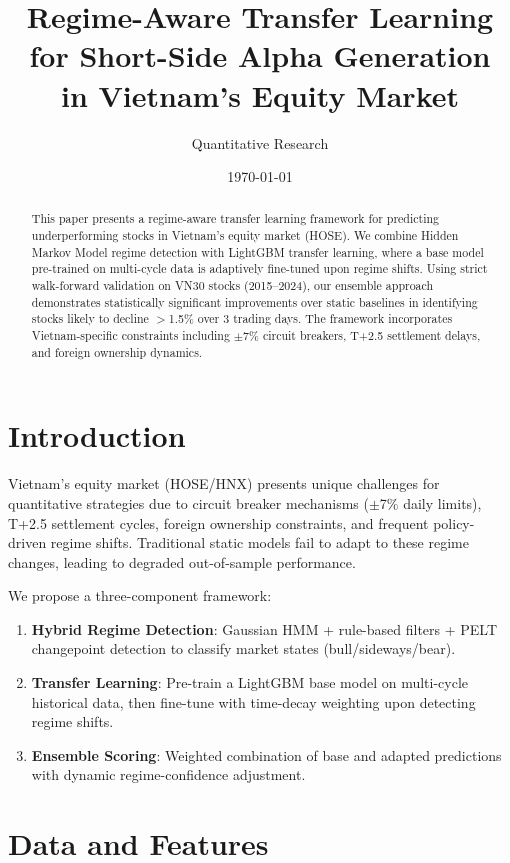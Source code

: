 \documentclass[12pt,a4paper]{article}
\title{Regime-Aware Transfer Learning for Short-Side Alpha Generation\\in Vietnam's Equity Market}
\author{Quantitative Research}
\date{\today}
\begin{document}
\maketitle

\begin{abstract}
This paper presents a regime-aware transfer learning framework for predicting
underperforming stocks in Vietnam's equity market (HOSE). We combine Hidden Markov
Model regime detection with LightGBM transfer learning, where a base model
pre-trained on multi-cycle data is adaptively fine-tuned upon regime shifts.
Using strict walk-forward validation on VN30 stocks (2015--2024), our ensemble
approach demonstrates statistically significant improvements over static baselines
in identifying stocks likely to decline $>$1.5\% over 3 trading days.
The framework incorporates Vietnam-specific constraints including $\pm$7\% circuit
breakers, T+2.5 settlement delays, and foreign ownership dynamics.
\end{abstract}

\section{Introduction}
\label{sec:intro}

Vietnam's equity market (HOSE/HNX) presents unique challenges for quantitative
strategies due to circuit breaker mechanisms ($\pm$7\% daily limits), T+2.5
settlement cycles, foreign ownership constraints, and frequent policy-driven
regime shifts. Traditional static models fail to adapt to these regime changes,
leading to degraded out-of-sample performance.

We propose a three-component framework:
\begin{enumerate}
    \item \textbf{Hybrid Regime Detection}: Gaussian HMM + rule-based filters +
          PELT changepoint detection to classify market states (bull/sideways/bear).
    \item \textbf{Transfer Learning}: Pre-train a LightGBM base model on
          multi-cycle historical data, then fine-tune with time-decay weighting
          upon detecting regime shifts.
    \item \textbf{Ensemble Scoring}: Weighted combination of base and adapted
          predictions with dynamic regime-confidence adjustment.
\end{enumerate}

\section{Data and Features}
\label{sec:data}
\end{document}
